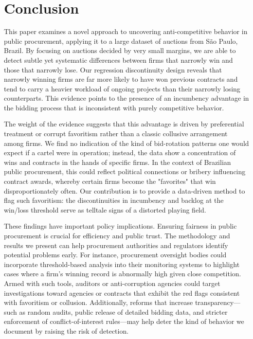 \section{Conclusion}\label{concl}
This paper examines a novel approach to uncovering anti-competitive behavior in public procurement, applying it to a large dataset of auctions from São Paulo, Brazil. By focusing on auctions decided by very small margins, we are able to detect subtle yet systematic differences between firms that narrowly win and those that narrowly lose. Our regression discontinuity design reveals that narrowly winning firms are far more likely to have won previous contracts and tend to carry a heavier workload of ongoing projects than their narrowly losing counterparts. This evidence points to the presence of an incumbency advantage in the bidding process that is inconsistent with purely competitive behavior.

The weight of the evidence suggests that this advantage is driven by preferential treatment or corrupt favoritism rather than a classic collusive arrangement among firms. We find no indication of the kind of bid-rotation patterns one would expect if a cartel were in operation; instead, the data show a concentration of wins and contracts in the hands of specific firms. In the context of Brazilian public procurement, this could reflect political connections or bribery influencing contract awards, whereby certain firms become the "favorites" that win disproportionately often. Our contribution is to provide a data-driven method to flag such favoritism: the discontinuities in incumbency and backlog at the win/loss threshold serve as telltale signs of a distorted playing field.

These findings have important policy implications. Ensuring fairness in public procurement is crucial for efficiency and public trust. The methodology and results we present can help procurement authorities and regulators identify potential problems early. For instance, procurement oversight bodies could incorporate threshold-based analysis into their monitoring systems to highlight cases where a firm’s winning record is abnormally high given close competition. Armed with such tools, auditors or anti-corruption agencies could target investigations toward agencies or contracts that exhibit the red flags consistent with favoritism or collusion. Additionally, reforms that increase transparency—such as random audits, public release of detailed bidding data, and stricter enforcement of conflict-of-interest rules—may help deter the kind of behavior we document by raising the risk of detection.

